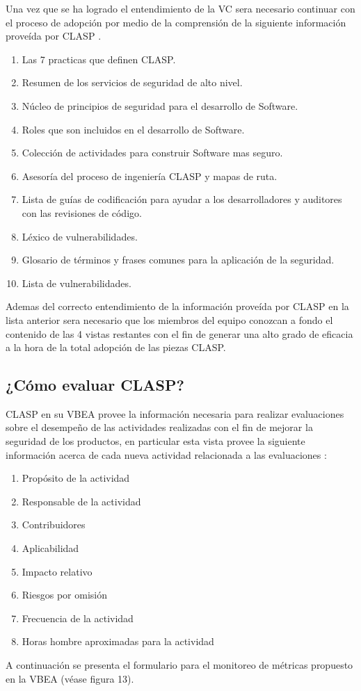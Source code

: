 \documentclass[runningheads,a4paper]{llncs}
\begin{document}
Una vez que se ha logrado el entendimiento de la \gls{VC} sera necesario continuar con el proceso de adopción  por medio de la comprensión de la siguiente información proveída por \gls{CLASP} \cite{CLASPIntroduction}.
\\
\begin{enumerate}
	\item Las 7 practicas que definen \gls{CLASP}.
	\item Resumen de los servicios de seguridad de alto nivel.
	\item Núcleo de principios de seguridad para el desarrollo de \gls{Software}.
	\item Roles que son incluidos en el desarrollo de \gls{Software}.
	\item Colección de actividades para construir \gls{Software} mas seguro.
	\item Asesoría del proceso de ingeniería \gls{CLASP} y mapas de ruta. 
	\item Lista de guías de codificación para ayudar a los desarrolladores y auditores con las revisiones de código.
	\item Léxico de vulnerabilidades.
	\item Glosario de términos y frases comunes para la aplicación de la seguridad.
	\item Lista de vulnerabilidades.\\
	
\end{enumerate}
Ademas del correcto entendimiento de la información proveída por \gls{CLASP} en la lista anterior sera necesario que los miembros del equipo conozcan a fondo el contenido de las 4 vistas restantes con el fin de generar una alto grado de eficacia a la hora de la total adopción de las piezas \gls{CLASP}. 

\subsection{¿Cómo evaluar \gls{CLASP}?}
\gls{CLASP} en su \gls{VBEA} provee la información necesaria para realizar evaluaciones sobre el desempeño de las actividades realizadas con el fin de mejorar la seguridad de los productos, en particular esta vista provee la siguiente información acerca de cada nueva actividad relacionada a las evaluaciones \cite{AAViewCLAPS}:

\begin{enumerate}
	\item Propósito de la actividad
	\item Responsable de la actividad
	\item Contribuidores
	\item Aplicabilidad
	\item Impacto relativo
	\item Riesgos por omisión
	\item Frecuencia de la actividad
	\item Horas hombre aproximadas para la actividad
	
\end{enumerate}
A continuación se presenta el formulario para el monitoreo de métricas propuesto en la \gls{VBEA} (véase figura 13).
\\
\end{document}
